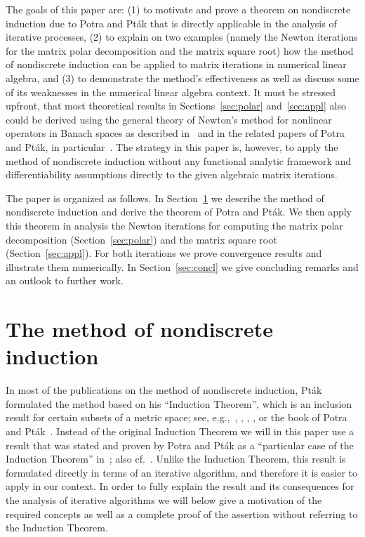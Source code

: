 \documentclass{siamltex}
\begin{document}
The goals of this paper are: (1) to motivate and prove a theorem on nondiscrete
induction due to Potra and Pt\'ak that is directly applicable in the analysis of
iterative processes, (2) to explain on two examples (namely the Newton iterations 
for the matrix polar decomposition and the matrix square root) how the method 
of nondiscrete induction can be applied to matrix iterations in numerical linear algebra, 
and (3) to demonstrate the method's effectiveness as well as discuss some of its 
weaknesses in the numerical linear algebra context.
It must be stressed upfront, that most theoretical results in Sections~\ref{sec:polar}
and~\ref{sec:appl} also could be derived using the general theory of Newton's
method for nonlinear operators in Banach spaces as
described in~\cite[Chapters~2 and~5]{PotPtaBook84} and in the related papers of
Potra and Pt\'ak, in particular~\cite{PotPta80,Pta76a}. The strategy in this paper is,
however, to apply the method of nondiscrete induction without any functional analytic
framework and differentiability assumptions directly to the given algebraic matrix
iterations.

The paper is organized as follows. In Section~\ref{sec:method} we describe the method
of nondiscrete induction and derive the theorem of Potra and Pt\'ak.
We then apply this theorem in analysis the Newton iterations for computing
the matrix polar decomposition (Section~\ref{sec:polar})
and the matrix square root (Section~\ref{sec:appl}). For both iterations we prove
convergence results and illustrate them numerically. In Section~\ref{sec:concl} we give
concluding remarks and an outlook to further work.

\section{The method of nondiscrete induction}\label{sec:method}

In most of the publications on the method of nondiscrete induction, Pt\'ak
formulated the method based on his ``Induction Theorem'', which is an inclusion
result for certain subsets of a metric space; see,
e.g.,~\cite[p.~280]{Pta76a}, \cite[p.~225]{Pta76b}, \cite[p.~282]{Pta77},
\cite[p.~52]{Pta89},
or the book of Potra and Pt\'ak~\cite[Proposition~1.7]{PotPtaBook84}.
Instead of the original Induction Theorem we will in this paper use a
result that was stated and proven by Potra and Pt\'ak as a ``particular
case of the Induction Theorem'' in~\cite[Proposition~1.9]{PotPtaBook84};
also cf.~\cite[p.~66]{PotPta80}. Unlike the Induction Theorem,
this result is formulated directly in terms of an iterative algorithm, and
therefore it is easier to apply in our context. In order to fully explain
the result and its consequences for the analysis of iterative algorithms
we will below give a motivation of the required concepts as well as a
complete proof of the assertion without referring to the Induction Theorem.
\end{document}
